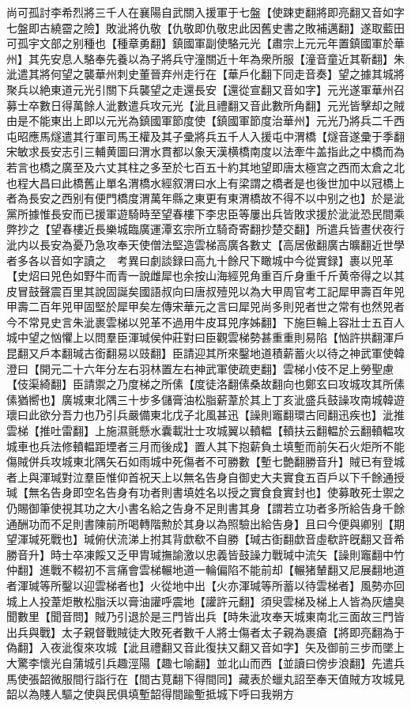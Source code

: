 尚可孤討李希烈將三千人在襄陽自武關入援軍于七盤【使踈吏翻將即亮翻又音如字七盤即古繞霤之險】敗泚將仇敬【仇敬即仇敬忠此因舊史書之敗補邁翻】遂取藍田可孤宇文部之别種也【種章勇翻】鎮國軍副使駱元光【肅宗上元元年置鎮國軍於華州】其先安息人駱奉先養以為子將兵守潼關近十年為衆所服【潼音童近其靳翻】朱泚遣其將何望之襲華州刺史董晉弃州走行在【華戶化翻下同走音奏】望之據其城將聚兵以絶東道元光引關下兵襲望之走還長安【還從宣翻又音如字】元光遂軍華州召募士卒數日得萬餘人泚數遣兵攻元光【泚且禮翻又音此數所角翻】元光皆擊却之賊由是不能東出上即以元光為鎮國軍節度使【鎮國軍節度治華州】元光乃將兵二千西屯昭應馬燧遣其行軍司馬王權及其子彚將兵五千人入援屯中渭橋【燧音遂彚于季翻宋敏求長安志引三輔黄圖曰渭水貫都以象天漢横橋南度以法牽牛盖指此之中橋而為若言也橋之廣至及六丈其柱之多至於七百五十約其地望即唐太極宫之西而太倉之北也程大昌曰此橋舊止單名渭橋水經叙渭曰水上有梁謂之橋者是也後世加中以冠橋上者為長安之西别有便門橋度渭萬年縣之東更有東渭橋故不得不以中别之也】於是泚黨所據惟長安而已援軍遊騎時至望春樓下李忠臣等屢出兵皆敗求援於泚泚恐民間乘弊抄之【望春樓近長樂城臨廣運潭玄宗所立騎奇寄翻抄楚交翻】所遣兵皆晝伏夜行泚内以長安為憂乃急攻奉天使僧法堅造雲梯高廣各數丈【高居傲翻廣古曠翻近世學者多各以音如字讀之　考異曰劇談録曰高九十餘尺下瞰城中今從實録】裹以兕革【史炤曰兕色如野牛而青一說雌犀也余按山海經兕角重百斤身重千斤黄帝得之以其皮冒鼓聲震百里其說固誕矣國語叔向曰唐叔殪兕以為大甲周官考工記犀甲壽百年兕甲壽二百年兕甲固堅於犀甲矣左傳宋華元之言曰犀兕尚多則兕者世之常有也然兕者今不常見史言朱泚裹雲梯以兕革不過用牛皮耳兕序姊翻】下施巨輪上容壯士五百人城中望之忷懼上以問羣臣渾瑊侯仲莊對曰臣觀雲梯勢甚重重則易陷【忷許拱翻渾戶昆翻又戶本翻瑊古銜翻易以豉翻】臣請迎其所來鑿地道積薪蓄火以待之神武軍使韓澄曰【開元二十六年分左右羽林置左右神武軍使疏吏翻】雲梯小伎不足上勞聖慮【伎渠綺翻】臣請禦之乃度梯之所傃【度徒洛翻傃桑故翻向也鄭玄曰攻城攻其所傃傃猶嚮也】廣城東北隅三十步多儲膏油松脂薪葦於其上丁亥泚盛兵鼓譟攻南城韓遊瓌曰此欲分吾力也乃引兵嚴備東北戊子北風甚迅【譟則竈翻環古囘翻迅疾也】泚推雲梯【推吐雷翻】上施濕氈懸水囊載壯士攻城翼以轒輼【轒扶云翻輼於云翻轒輼攻城車也兵法修轒輼距堙者三月而後成】置人其下抱薪負土填塹而前矢石火炬所不能傷賊併兵攻城東北隅矢石如雨城中死傷者不可勝數【塹七艶翻勝音升】賊已有登城者上與渾瑊對泣羣臣惟仰首祝天上以無名告身自御史大夫實食五百戶以下千餘通授瑊【無名告身即空名告身有功者則書填姓名以授之實食食實封也】使募敢死士禦之仍賜御筆使視其功之大小書名給之告身不足則書其身【謂若立功者多所給告身千餘通酬功而不足則書陳前所喝轉階勲於其身以為照驗出給告身】且曰今便與卿别【期望渾瑊死戰也】瑊俯伏流涕上拊其背歔欷不自勝【瑊古衘翻歔音虛欷許旣翻又音希勝音升】時士卒凍餒又乏甲胄瑊撫諭激以忠義皆鼓譟力戰瑊中流矢【譟則竈翻中竹仲翻】進戰不輟初不言痛會雲梯輾地道一輪偏陷不能前却【輾猪輦翻又尼展翻地道者渾瑊等所鑿以迎雲梯者也】火從地中出【火亦渾瑊等所蓄以待雲梯者】風勢亦回城上人投葦炬散松脂沃以膏油讙呼震地【讙許元翻】須臾雲梯及梯上人皆為灰燼臭聞數里【聞音問】賊乃引退於是三門皆出兵【時朱泚攻奉天城東南北三面故三門皆出兵與戰】太子親督戰賊徒大敗死者數千人將士傷者太子親為裹瘡【將即亮翻為于偽翻】入夜泚復來攻城【泚且禮翻又音此復扶又翻又音如字】矢及御前三步而墜上大驚李懷光自蒲城引兵趣涇陽【趣七喻翻】並北山而西【並讀曰傍步浪翻】先遣兵馬使張韶微服間行詣行在【間古莧翻下得間同】藏表於蠟丸詔至奉天值賊方攻城見韶以為賤人驅之使與民俱填塹韶得間踰塹抵城下呼曰我朔方